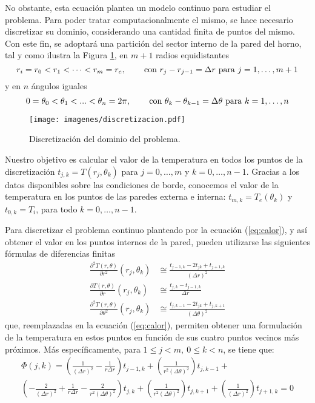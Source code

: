         No obstante, esta ecuación plantea un modelo continuo para estudiar el problema. Para poder tratar computacionalmente el mismo, se hace necesario discretizar su dominio, considerando una cantidad finita de puntos del mismo. Con este fin, se adoptará una partición del sector interno de la pared del horno, tal y como ilustra la Figura \ref{fig:discretizacion}, en $m + 1$ radios equidistantes
        \[ r_i = r_0 < r_1 < \dots < r_m = r_e \text{, \qquad con } r_j - r_{j-1} = \Delta r \text{ para } j = 1, \dots, m+1 \]
        y en $n$ ángulos iguales
        \[ 0 = \theta_0 < \theta_1 < ... < \theta_n = 2\pi \text{, \qquad con } \theta_k - \theta_{k-1} = \Delta \theta \text{ para } k = 1, \dots, n \]

        \begin{figure}[h]
          \centering

          \texttt{[image: imagenes/discretizacion.pdf]}

          \caption{Discretización del dominio del problema.}
          \label{fig:discretizacion}
        \end{figure}

        Nuestro objetivo es calcular el valor de la temperatura en todos los puntos de la discretización $t_{j,k} = T(r_j, \theta_k)$ para $j = 0, \dots, m$ y $k = 0, \dots, n-1$. Gracias a los datos disponibles sobre las condiciones de borde, conocemos el valor de la temperatura en los puntos de las paredes externa e interna: $t_{m,k} = T_e(\theta_k)$ y $t_{0,k} = T_i$, para todo $k = 0, \dots, n-1$.

        Para discretizar el problema continuo planteado por la ecuación (\ref{eq:calor}), y así obtener el valor en los puntos internos de la pared, pueden utilizarse las siguientes fórmulas de diferencias finitas
        \begin{align*}
            \frac{\partial^2 T(r, \theta)}{\partial r^2}(r_j, \theta_k) &\cong \frac{t_{j-1,k} - 2 t_{jk} + t_{j+1,k}}{(\Delta r)^2} \\
            \frac{\partial T(r, \theta)}{\partial r}(r_j, \theta_k) &\cong \frac{t_{j,k} - t_{j-1,k}}{\Delta r} \\
            \frac{\partial^2 T(r, \theta)}{\partial \theta^2}(r_j, \theta_k) &\cong \frac{t_{j,k-1} - 2 t_{jk} + t_{j,k+1}}{(\Delta \theta)^2}
        \end{align*}
        que, reemplazadas en la ecuación (\ref{eq:calor}), permiten obtener una formulación de la temperatura en estos puntos en función de sus cuatro puntos vecinos más próximos. Más específicamente, para $1 \leq j < m,\ 0 \leq k < n$, se tiene que:
        \begin{multline} \label{eq:calor-discreto}
            \Phi(j,k) = \left( \frac{1}{(\Delta r)^2} - \frac{1}{r \Delta r} \right) t_{j-1,k} +
                \left( \frac{1}{r^2(\Delta \theta)^2} \right) t_{j,k-1} + \\
                \left( - \frac{2}{(\Delta r)^2} + \frac{1}{r \Delta r} - \frac{2}{r^2(\Delta \theta)^2} \right) t_{j,k} +
                \left( \frac{1}{r^2(\Delta \theta)^2} \right) t_{j,k+1} +
                \left( \frac{1}{(\Delta r)^2} \right) t_{j+1,k} = 0
        \end{multline}

